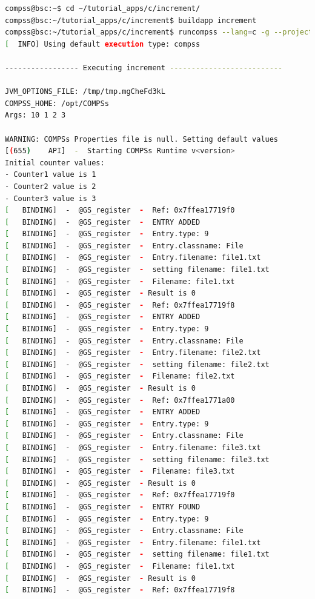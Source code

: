 \begin{lstlisting}[language=bash]
compss@bsc:~$ cd ~/tutorial_apps/c/increment/
compss@bsc:~/tutorial_apps/c/increment$ buildapp increment
compss@bsc:~/tutorial_apps/c/increment$ runcompss --lang=c -g --project=./xml/project.xml --resources=./xml/resources.xml ~/tutorial_apps/c/increment/master/increment 10 1 2 3
[  INFO] Using default execution type: compss

----------------- Executing increment --------------------------

JVM_OPTIONS_FILE: /tmp/tmp.mgCheFd3kL
COMPSS_HOME: /opt/COMPSs
Args: 10 1 2 3
 
WARNING: COMPSs Properties file is null. Setting default values
[(655)    API]  -  Starting COMPSs Runtime v<version>
Initial counter values: 
- Counter1 value is 1
- Counter2 value is 2
- Counter3 value is 3
[   BINDING]  -  @GS_register  -  Ref: 0x7ffea17719f0
[   BINDING]  -  @GS_register  -  ENTRY ADDED
[   BINDING]  -  @GS_register  -  Entry.type: 9
[   BINDING]  -  @GS_register  -  Entry.classname: File
[   BINDING]  -  @GS_register  -  Entry.filename: file1.txt
[   BINDING]  -  @GS_register  -  setting filename: file1.txt
[   BINDING]  -  @GS_register  -  Filename: file1.txt
[   BINDING]  -  @GS_register  - Result is 0
[   BINDING]  -  @GS_register  -  Ref: 0x7ffea17719f8
[   BINDING]  -  @GS_register  -  ENTRY ADDED
[   BINDING]  -  @GS_register  -  Entry.type: 9
[   BINDING]  -  @GS_register  -  Entry.classname: File
[   BINDING]  -  @GS_register  -  Entry.filename: file2.txt
[   BINDING]  -  @GS_register  -  setting filename: file2.txt
[   BINDING]  -  @GS_register  -  Filename: file2.txt
[   BINDING]  -  @GS_register  - Result is 0
[   BINDING]  -  @GS_register  -  Ref: 0x7ffea1771a00
[   BINDING]  -  @GS_register  -  ENTRY ADDED
[   BINDING]  -  @GS_register  -  Entry.type: 9
[   BINDING]  -  @GS_register  -  Entry.classname: File
[   BINDING]  -  @GS_register  -  Entry.filename: file3.txt
[   BINDING]  -  @GS_register  -  setting filename: file3.txt
[   BINDING]  -  @GS_register  -  Filename: file3.txt
[   BINDING]  -  @GS_register  - Result is 0
[   BINDING]  -  @GS_register  -  Ref: 0x7ffea17719f0
[   BINDING]  -  @GS_register  -  ENTRY FOUND
[   BINDING]  -  @GS_register  -  Entry.type: 9
[   BINDING]  -  @GS_register  -  Entry.classname: File
[   BINDING]  -  @GS_register  -  Entry.filename: file1.txt
[   BINDING]  -  @GS_register  -  setting filename: file1.txt
[   BINDING]  -  @GS_register  -  Filename: file1.txt
[   BINDING]  -  @GS_register  - Result is 0
[   BINDING]  -  @GS_register  -  Ref: 0x7ffea17719f8

\end{lstlisting}
